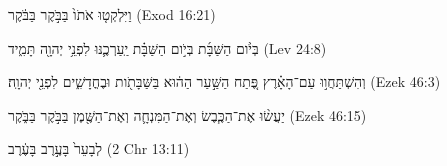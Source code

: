 
\begin{exe}

\ex\label{regrec_prepdistr_exs1}
\texthebrew{
וַיִּלְקְט֤וּ אֹתֹו֙ בַּבֹּ֣קֶר בַּבֹּ֔קֶר 
} (Exod 16:21)

\ex\label{regrec_prepdistr_exs2}
\texthebrew{
בְּיֹ֨ום הַשַּׁבָּ֜ת בְּיֹ֣ום הַשַּׁבָּ֗ת יַֽעַרְכֶ֛נּוּ לִפְנֵ֥י יְהוָ֖ה תָּמִ֑יד 
} (Lev 24:8)

\ex\label{regrec_prepdistr_exs3}
\texthebrew{
וְהִשְׁתַּחֲו֣וּ עַם־הָאָ֗רֶץ פֶּ֚תַח הַשַּׁ֣עַר הַה֔וּא בַּשַּׁבָּתֹ֖ות וּבֶחֳדָשִׁ֑ים לִפְנֵ֖י יְהוָֽה׃ 
} (Ezek 46:3)

\ex\label{regrec_prepdistr_exs4}
\texthebrew{
יַעֲשׂ֨וּ אֶת־הַכֶּ֧בֶשׂ וְאֶת־הַמִּנְחָ֛ה וְאֶת־הַשֶּׁ֖מֶן בַּבֹּ֣קֶר בַּבֹּ֑קֶר 
} (Ezek 46:15)

\ex\label{regrec_prepdistr_exs5}
\texthebrew{
לְבָעֵר֙ בָּעֶ֣רֶב בָּעֶ֔רֶב 
} (2 Chr 13:11)

\end{exe}
